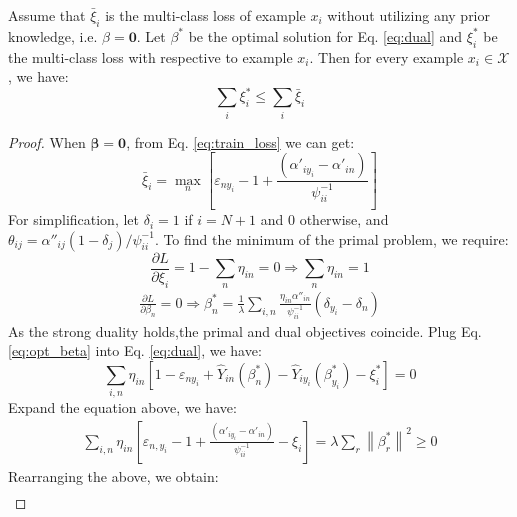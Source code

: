 Assume that $\bar \xi_i$ is the multi-class loss of example $x_i$ without utilizing any prior knowledge, i.e. $\beta = \mathbf{0}$. Let $ \beta^*$ be the optimal solution for Eq. \eqref{eq:dual} and $\xi_i^*$ be the multi-class loss with respective to example $x_i$. Then for every example $x_i \in \mathcal{X}$, we have:\[\sum\limits_i {{\xi^* _i}}  \le \sum\limits_i {{{\bar \xi }_i}} \]

\begin{proof}
When $\mathbf{\beta} = \mathbf{0}$, from Eq. \eqref{eq:train_loss} we can get:
\begin{equation*}
{\bar \xi _i} = \mathop {\max }\limits_n \left[ { {\varepsilon _{n{y_i}}}-1 + \frac{{\left( {{{\alpha '}_{i{y_i}}} - {{\alpha '}_{in}}} \right)}}{{\psi _{ii}^{ - 1}}}} \right]
\end{equation*}
For simplification, let $\delta_i=1$ if $i=N+1$ and 0 otherwise, and  ${\theta _{ij}} = {\alpha ''_{ij}}\left( {1 - {\delta _j}} \right)/\psi_{ii}^{ - 1}$.
To find the minimum of the primal problem, we require:
\begin{equation}
\frac{{\partial L}}{{\partial {\xi _i}}} = 1 - \sum\limits_n {{\eta _{in}}}  = 0 \Rightarrow \sum\limits_n {{\eta _{in}}}  = 1
\end{equation}   
\begin{eqnarray}\label{eq:opt_beta}
\frac{{\partial L}}{{\partial {\beta _n}}}  = 0 
\Rightarrow \beta _n^* = \frac{1}{{{\lambda}}}\sum\limits_{i,n} {\frac{{{\eta _{in}}{{\alpha ''}_{in}}}}{{\psi _{ii}^{ - 1}}}\left( {{\delta _{{y_i}}} - {\delta _n}} \right)} 
\end{eqnarray}
As the strong duality holds,the primal and dual objectives coincide. Plug Eq. \eqref{eq:opt_beta} into Eq. \eqref{eq:dual}, we have:
\begin{equation*}
\sum\limits_{i,n} {{\eta _{in}}\left[ {1 - {\varepsilon _{n{y_i}}} + {{\hat Y}_{in}}\left( {\beta_n^* } \right) - {{\hat Y}_{i{y_i}}}\left( {\beta_{y_i}^* } \right) - {\xi _i^*}} \right]}=0
\end{equation*}
Expand the equation above, we have:
\begin{eqnarray}\nonumber
\sum\limits_{i,n} {{\eta _{in}}\left[ { {\varepsilon _{n,{y_i}}}-1 + \frac{{\left( {{{\alpha '}_{i{y_i}}} - {{\alpha '}_{in}}} \right)}}{{\psi_{ii}^{ - 1}}} - {\xi _i}} \right]} 
= {\lambda }\sum\limits_r {{{\left\| {\beta _r^*} \right\|}^2}}  \ge 0\nonumber
\end{eqnarray}
Rearranging the above, we obtain:
\begin{eqnarray}\label{eq:link1}

\end{eqnarray}
\end{proof}
